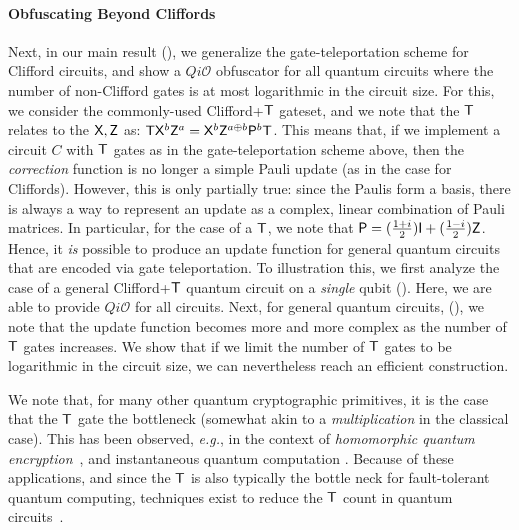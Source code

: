 \paragraph{Obfuscating Beyond Cliffords} Next, in our main result (), we generalize the gate-teleportation scheme for Clifford circuits, and show a $Qi\mathcal{O}$ obfuscator for all quantum circuits where the number of non-Clifford  gates is at most logarithmic in the circuit size. For this, we consider the commonly-used Clifford+${\sf T}$ gateset, and we note that the ${\sf T}$ relates to the ${\sf X}, {\sf Z}$ as: ${\sf T} {\sf X}^b {\sf Z}^a={\sf X}^b {\sf Z}^{a\oplus b}{\sf P}^b {\sf T}$. This means that, if we implement a circuit $C$ with ${\sf T}$ gates as in the gate-teleportation scheme above, then the \emph{correction} function is no longer a simple Pauli update (as in the case for Cliffords). However, this is only partially true: since the Paulis form a basis, there is always a way to represent an update as a complex, linear combination of Pauli matrices. In particular, for the case of a ${\sf T}$, we note that ${\sf P}=(\frac{1+i}{2}) {\sf I} + (\frac{1-i}{2}){\sf Z}$. Hence, it \emph{is} possible to produce an update function for general quantum circuits that are encoded via gate teleportation. To illustration this, we first analyze the case of a general Clifford+${\sf T}$ quantum circuit on a \emph{single} qubit (). Here, we are able to provide $Qi\mathcal{O}$ for all circuits. Next, for general quantum circuits, (), we note that the update function becomes more and more complex as the number of ${\sf T}$ gates increases. We show that if we limit the number of ${\sf T}$ gates to be logarithmic in the circuit size, we can nevertheless reach an efficient construction.


We note that,  for many other quantum cryptographic primitives, it is the case that the ${\sf T}$ gate the bottleneck (somewhat akin to a \emph{multiplication} in the classical case). This has been observed, \emph{e.g.}, in the context of \emph{homomorphic quantum encryption}~\cite{BJ15}, and instantaneous quantum computation \cite{Spel16}.
Because of these applications, and since the ${\sf T}$ is also typically the bottle neck for fault-tolerant quantum computing, techniques exist to reduce the ${\sf T}$ count in quantum circuits~\cite{AMMR13,DMM16,AMM14}.



